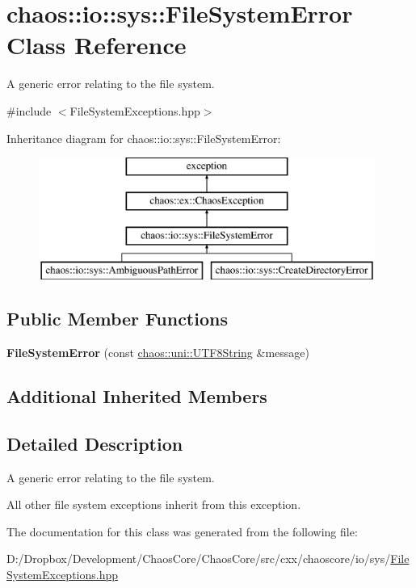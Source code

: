 \hypertarget{classchaos_1_1io_1_1sys_1_1_file_system_error}{}\section{chaos\+:\+:io\+:\+:sys\+:\+:File\+System\+Error Class Reference}
\label{classchaos_1_1io_1_1sys_1_1_file_system_error}


A generic error relating to the file system.  




{\ttfamily \#include $<$File\+System\+Exceptions.\+hpp$>$}

Inheritance diagram for chaos\+:\+:io\+:\+:sys\+:\+:File\+System\+Error\+:\begin{figure}[H]
\begin{center}
\leavevmode
\includegraphics[height=4.000000cm]{classchaos_1_1io_1_1sys_1_1_file_system_error}
\end{center}
\end{figure}
\subsection*{Public Member Functions}
\begin{DoxyCompactItemize}
\item 
\hypertarget{classchaos_1_1io_1_1sys_1_1_file_system_error_a9da12ab81ffc6b146e6ac4bd60536bd2}{}{\bfseries File\+System\+Error} (const \hyperlink{classchaos_1_1uni_1_1_u_t_f8_string}{chaos\+::uni\+::\+U\+T\+F8\+String} \&message)\label{classchaos_1_1io_1_1sys_1_1_file_system_error_a9da12ab81ffc6b146e6ac4bd60536bd2}

\end{DoxyCompactItemize}
\subsection*{Additional Inherited Members}


\subsection{Detailed Description}
A generic error relating to the file system. 

All other file system exceptions inherit from this exception. 

The documentation for this class was generated from the following file\+:\begin{DoxyCompactItemize}
\item 
D\+:/\+Dropbox/\+Development/\+Chaos\+Core/\+Chaos\+Core/src/cxx/chaoscore/io/sys/\hyperlink{_file_system_exceptions_8hpp}{File\+System\+Exceptions.\+hpp}\end{DoxyCompactItemize}
